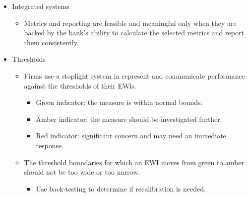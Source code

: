 \begin{itemize}
\item Integrated systems
    \begin{itemize}
    \item Metrics and reporting are feasible and meaningful only when they are backed by the bank's ability to calculate the selected metrics and report them consistently.
    \end{itemize}
    
\item Thresholds
    \begin{itemize}
    \item Firms use a stoplight system in represent and communicate performance against the thresholds of their EWls.
        \begin{itemize}
        \item Green indicator: the measure is within normal bounds.
        \item Amber indicator: the measure should be investigated further.
        \item Red indicator: significant concern and may need an immediate response.
        \end{itemize}
    \item The threshold boundaries for which an EWI moves from green to amber should not be too wide or too narrow.
        \begin{itemize}
        \item Use back-testing to determine if recalibration is needed.
        \end{itemize}
    \end{itemize}
    
\end{itemize}



